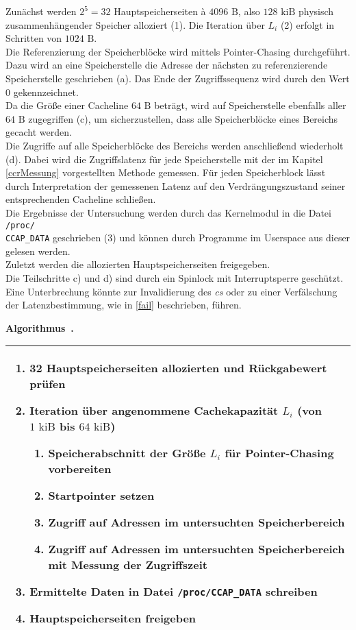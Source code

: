 \documentclass[]{scrbook}
\newcounter{example}[chapter]
\newenvironment{example}[1][]
    {\refstepcounter{example} \medskip \noindent \textbf{Algorithmus~\thechapter.\theexample #1}\\
    \begin{tabular}{|p{\textwidth}|}
    \hline
    }
    { 
    \\\hline
    \end{tabular} 
    }
\begin{document}
Zunächst werden $2^5 = 32$ Hauptspeicherseiten à $4096 \textrm{ B}$, also $128 \textrm{ kiB}$ physisch zusammenhängender Speicher alloziert (1). Die Iteration über $L_i$ (2) erfolgt in Schritten von $1024 \textrm{ B}$.
\\
Die Referenzierung der Speicherblöcke wird mittels Pointer-Chasing durchgeführt. 
Dazu wird an eine Speicherstelle die Adresse der nächsten zu referenzierende Speicherstelle geschrieben (a).
Das Ende der Zugriffssequenz wird durch den Wert $0$ gekennzeichnet.
\\
Da die Größe einer Cacheline $64 \textrm{ B}$ beträgt, wird auf Speicherstelle ebenfalls aller $64 \textrm{ B}$ zugegriffen (c), um sicherzustellen, dass alle Speicherblöcke eines Bereichs gecacht werden.
\\
Die Zugriffe auf alle Speicherblöcke des Bereichs werden anschließend wiederholt (d). 
Dabei wird die Zugriffslatenz für jede Speicherstelle mit der im Kapitel \ref{ccrMessung} vorgestellten Methode gemessen. 
Für jeden Speicherblock lässt durch Interpretation der gemessenen Latenz auf den Verdrängungszustand seiner entsprechenden Cacheline schließen.  
\\
Die Ergebnisse der Untersuchung werden durch das Kernelmodul in die Datei \texttt{/proc/\\ CCAP\_DATA} geschrieben (3) und können durch Programme im Userspace aus dieser gelesen werden.
\\
Zuletzt werden die allozierten Hauptspeicherseiten freigegeben.
\\
Die Teilschritte c) und d) sind durch ein Spinlock mit Interruptsperre geschützt.
Eine Unterbrechung könnte zur Invalidierung des \textsl{\gls{c}s} oder zu einer Verfälschung der Latenzbestimmung, wie in \ref{fail} beschrieben, führen.

\begin{example} \label{ccap_alg}
\begin{enumerate}
	\item 32 Hauptspeicherseiten allozierten und Rückgabewert prüfen
	\item Iteration über angenommene Cachekapazität $L_i$ (von $1 \textrm{ kiB}$ bis $64 \textrm{ kiB}$)
	\begin{enumerate}
		\item Speicherabschnitt der Größe $L_i$ für Pointer-Chasing vorbereiten
		\item Startpointer setzen
		\item Zugriff auf Adressen im untersuchten Speicherbereich
		\item Zugriff auf Adressen im untersuchten Speicherbereich mit Messung der Zugriffszeit
	\end{enumerate}
	\item Ermittelte Daten in Datei \texttt{/proc/CCAP\_DATA} schreiben
	\item Hauptspeicherseiten freigeben
\end{enumerate}
\end{example}
\end{document}
